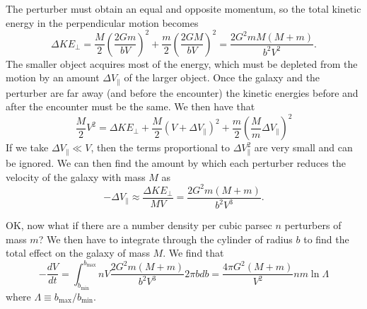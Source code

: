 \documentclass[]{article}
\begin{document}
The perturber must obtain an equal and opposite momentum, so the
total kinetic energy in the perpendicular motion becomes
\begin{equation}
\Delta KE_{\perp} = \frac{M}{2}\left(\frac{2Gm}{bV}\right)^2 + \frac{m}{2}\left(\frac{2GM}{bV}\right)^2 = \frac{2G^2mM(M+m)}{b^2 V^2}.
\end{equation}
\noindent
The smaller object acquires most of the energy, which must be depleted from the motion by an amount $\Delta V_{\parallel}$ of the
larger object.  Once the galaxy and the perturber are far away (and before the encounter) the kinetic energies 
before and after the encounter must be the same.  We then have that
\begin{equation}
\frac{M}{2}V^2 = \Delta KE_{\perp} + \frac{M}{2}(V + \Delta V_{\parallel})^2 + \frac{m}{2}\left(\frac{M}{m} \Delta V_{\parallel} \right)^2
\end{equation}
\noindent
If we take $\Delta V_{\parallel} \ll V$, then the terms proportional to $\Delta V_{\parallel}^2$ are very small and
can be ignored.  We can then find the amount by which each perturber reduces the velocity of the galaxy with
mass $M$ as
\begin{equation}
- \Delta V_{\parallel} \approx \frac{\Delta KE_{\perp}}{M V} = \frac{2G^2 m(M+m)}{b^2 V^3}.
\end{equation}

OK, now what if there are a number density per cubic parsec $n$ perturbers of mass $m$?  
We then have to integrate through the cylinder of radius $b$ to find the total
effect on the galaxy of mass $M$.  We find that
\begin{equation}
-\frac{dV}{dt} = \int_{b_{\mathrm{min}}}^{b_{\mathrm{max}}} n V \frac{2G^2 m (M+m)}{b^2 V^3} 2\pi b db = \frac{4\pi G^2(M+m)}{V^2} n m \ln \Lambda
\end{equation}
\noindent
where $\Lambda\equiv b_{\mathrm{max}}/b_{\mathrm{min}}$.
\end{document}
